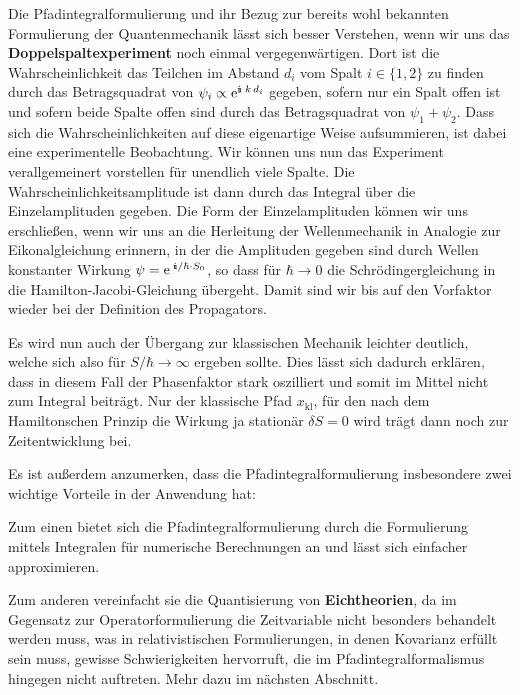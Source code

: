 Die Pfadintegralformulierung und ihr Bezug zur bereits wohl bekannten Formulierung der Quantenmechanik lässt sich  besser Verstehen, wenn wir uns das {\bf Doppelspaltexperiment} noch einmal vergegenwärtigen. Dort ist die Wahrscheinlichkeit das Teilchen im Abstand $d_i$ vom Spalt $i\in\{1,2\}$ zu finden durch das Betragsquadrat von $\psi_i\propto\e^{\I\;k\,d_i}$ gegeben, sofern nur ein Spalt offen ist und sofern beide Spalte offen sind durch das Betragsquadrat von $\psi_1+\psi_2$. Dass sich die Wahrscheinlichkeiten auf diese eigenartige Weise aufsummieren, ist dabei eine experimentelle Beobachtung. Wir können uns nun das Experiment verallgemeinert vorstellen für unendlich viele Spalte. Die Wahrscheinlichkeitsamplitude ist dann durch das Integral über die Einzelamplituden gegeben. Die Form der Einzelamplituden können wir uns erschließen, wenn wir uns an die Herleitung der Wellenmechanik in Analogie zur Eikonalgleichung erinnern, in der die Amplituden gegeben sind durch Wellen konstanter Wirkung $\psi=\e^{\;\I/\hbar\cdot S_0}$, so dass für $\hbar\to0$ die Schrödingergleichung in die Hamilton-Jacobi-Gleichung übergeht. Damit sind wir bis auf den Vorfaktor wieder bei der Definition des Propagators. 

Es wird nun auch der Übergang zur klassischen Mechanik leichter deutlich, welche sich also für $S/\hbar\to\infty$ ergeben sollte. Dies lässt sich dadurch erklären, dass in diesem Fall der Phasenfaktor stark oszilliert und somit im Mittel nicht zum Integral beiträgt. Nur der klassische Pfad $x_{\text{kl}}$, für den nach dem Hamiltonschen Prinzip die Wirkung ja stationär $\delta S=0$ wird trägt dann noch zur Zeitentwicklung bei. 

Es ist außerdem anzumerken, dass die Pfadintegralformulierung insbesondere zwei wichtige Vorteile in der Anwendung hat: 
\begin{itemize1}
	\item Zum einen bietet sich die Pfadintegralformulierung durch die Formulierung mittels Integralen für numerische Berechnungen an und lässt sich einfacher approximieren. 
	\item Zum anderen vereinfacht sie die Quantisierung von {\bf Eichtheorien}, da im Gegensatz zur Operatorformulierung die Zeitvariable nicht besonders behandelt werden muss, was in relativistischen Formulierungen, in denen Kovarianz erfüllt sein muss, gewisse Schwierigkeiten hervorruft, die im Pfadintegralformalismus hingegen nicht auftreten. Mehr dazu im nächsten Abschnitt. 
\end{itemize1}


